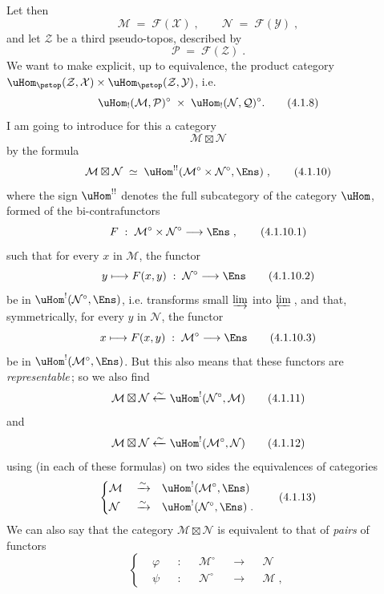 Let then
\[
\mathcal{M} \;=\; \mathcal{F}(\mathcal{X})\;, \qquad \mathcal{N} \;=\; \mathcal{F}(\mathcal{Y})\;,
\tag*{(4.1.6)}
\]
and let $\mathcal{Z}$ be a third pseudo-topos, described by
\[
\mathcal{P} \;=\; \mathcal{F}(\mathcal{Z})\;.
\tag*{(4.1.7)}
\]
We want to make explicit, up to equivalence, the product category $\uHom_{\pstop}(\mathcal{Z},\mathcal{X})\times\uHom_{\pstop}(\mathcal{Z},\mathcal{Y})$, i.e.
\[
\uHom_!(\mathcal{M},\mathcal{P})^\circ \;\times\; \uHom_!(\mathcal{N},\mathcal{Q})^\circ.
\tag*{(4.1.8)}
\] %
I am going to introduce for this a category
\[
\mathcal{M}\boxtimes\mathcal{N}
\tag*{(4.1.9)}
\]
by the formula
\[
\mathcal{M}\boxtimes\mathcal{N} \;\simeq\; \uHom^{!!}(\mathcal{M}^\circ\times\mathcal{N}^\circ,\Ens)\;,
\tag*{(4.1.10)}
\]
where the sign $\uHom^{!!}$ denotes the full subcategory of the category $\uHom$, formed of the bi-contrafunctors %
\[
F \;:\; \mathcal{M}^\circ\times\mathcal{N}^\circ \longrightarrow \Ens\;,
\tag*{(4.1.10.1)}
\]
such that for every $x$ in $\mathcal{M}$, the functor
\[
y \longmapsto F(x,y) \;:\; \mathcal{N}^\circ \longrightarrow \Ens
\tag*{(4.1.10.2)}
\]
be in $\uHom^!(\mathcal{N}^\circ,\Ens)$, i.e. transforms small $\varinjlim$ into $\varprojlim$\,, and that, symmetrically, for every $y$ in $\mathcal{N}$, the functor
\[
x \longmapsto F(x,y) \;:\; \mathcal{M}^\circ \longrightarrow \Ens
\tag*{(4.1.10.3)}
\]
be in $\uHom^!(\mathcal{M}^\circ,\Ens)$. But this also means that these functors are \textit{representable}\,; so we also find
\[
\mathcal{M}\boxtimes\mathcal{N} \xleftarrow{\sim} \uHom^!(\mathcal{N}^\circ,\mathcal{M})
\tag*{(4.1.11)}
\]
and
\[
\mathcal{M}\boxtimes\mathcal{N} \xleftarrow{\sim} \uHom^!(\mathcal{M}^\circ,\mathcal{N})
\tag*{(4.1.12)}
\]
using (in each of these formulas) on two sides the equivalences of categories
\[
\left\{
\begin{aligned}
&\mathcal{M} &&\xrightarrow{\sim} &&\uHom^!(\mathcal{M}^\circ,\Ens)\\
&\mathcal{N} &&\xrightarrow{\sim} &&\uHom^!(\mathcal{N}^\circ,\Ens)\;.
\end{aligned}
\right.
\tag*{(4.1.13)}
\]
We can also say that the category $\mathcal{M}\boxtimes\mathcal{N}$ is equivalent to that of \textit{pairs} of functors
\[
\left\{
\begin{aligned}
&\varphi &&: &&\mathcal{M}^\circ &&\longrightarrow &&\mathcal{N}\\
&\psi &&: &&\mathcal{N}^\circ &&\longrightarrow &&\mathcal{M}\;,
\end{aligned}
\right.
\tag*{(4.1.14)}
\]

